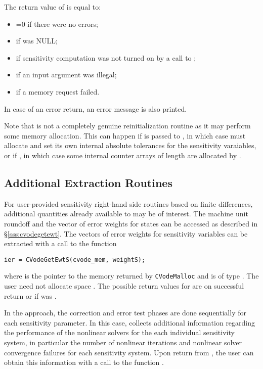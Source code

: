 The return value  of  is equal to: 
\begin{itemize}
\item {}=0 if there were no errors; 
\item {} if  was NULL;
\item {} if sensitivity computation was not turned on
      by a call to ;
\item {} if an input argument was illegal;
\item {} if a memory request failed.
\end{itemize}
In case of an error return, an error message is also printed.  

Note that  is not a completely genuine reinitialization
routine as it may perform some memory allocation. This can happen
if  is passed to , in which case {\cvodes}
must allocate and set its own internal absolute tolerances for the sensitivity
varaiables, or if , in which case some internal counter
arrays of length  are allocated by .

\subsection{Additional Extraction Routines}\label{sss:more_extraction}

For user-provided sensitivity right-hand side routines based on finite
differences, additional quantities already available to {\cvodes} may
be of interest. The machine unit roundoff and the vector of error weights
for states can be accessed as described in \S\ref{sss:cvodegetewt}.
The vectors of error weights for sensitivity variables can be extracted
with a call to the function
\begin{verbatim}
ier = CVodeGetEwtS(cvode_mem, weightS);
\end{verbatim}
where  is the pointer to the {\cvodes} memory returned by 
{\tt CVodeMalloc} and  is of type . 
The user need not allocate space . The possible return
values for  are  on successful return or 
if  was .

In the  approach, the correction and error test phases are done sequentially
for each sensitivity parameter. In this case, {\cvodes} collects additional information 
regarding the performance of the nonlinear solvers for the each individual sensitivity 
system, in particular the number of nonlinear iterations and nonlinear 
solver convergence failures for each sensitivity system.
Upon return from , the user can obtain this information 
with a call to the function . 

